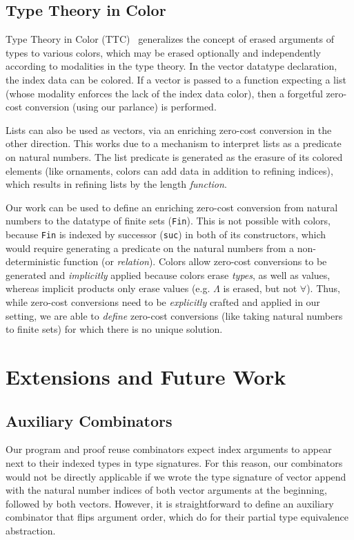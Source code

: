 \documentclass[acmsmall]{acmart}\settopmatter{}
\newcommand{\labsec}[1]{\label{sec:#1}}
\begin{document}
\subsection{Type Theory in Color}

Type Theory in Color (TTC)~\cite{bernardy:color}
generalizes the concept of erased arguments
of types to various colors, which may be erased optionally and
independently according to modalities in the type theory. In the vector
datatype declaration, the index data can be colored. If a vector is
passed to a function expecting a list (whose modality enforces the
lack of the index data color), then a forgetful zero-cost conversion
(using our parlance) is performed.

Lists can also be used as vectors, via an enriching zero-cost
conversion in the other direction. This works due to a mechanism to
interpret lists as a predicate on natural numbers. The list predicate is
generated as the erasure of its colored elements (like ornaments,
colors can add data in addition to refining indices), which results in
refining lists by the length \textit{function}.

Our work can be used to define an enriching zero-cost conversion
from natural numbers to the datatype of
finite sets (\texttt{Fin}). This is not possible with colors, because
\texttt{Fin} is indexed by successor (\texttt{suc}) in both of its
constructors, which would require generating a predicate on the
natural numbers from a non-deterministic function (or
\textit{relation}). Colors allow zero-cost conversions to be
generated and \textit{implicitly} applied because colors erase \textit{types}, as
well as values, whereas implicit products only erase values
(e.g. $\Lambda$ is erased, but not $\forall$).
Thus, while zero-cost conversions
need to be \textit{explicitly} crafted and applied in our setting, we
are able to \textit{define} zero-cost conversions (like taking natural numbers to
finite sets) for which there is no unique solution.


\section{Extensions and Future Work}
\labsec{future}

\subsection{Auxiliary Combinators}

Our program and proof reuse combinators expect index arguments to
appear next to their indexed types in type signatures. For this
reason, our combinators would not be directly applicable if we wrote
the type signature of vector append with the natural number indices of
both vector arguments at the beginning, followed by both
vectors. However, it is straightforward to define an auxiliary combinator that
flips argument order, which \citet{dagand:interop} do for their
partial type equivalence abstraction.
\end{document}
